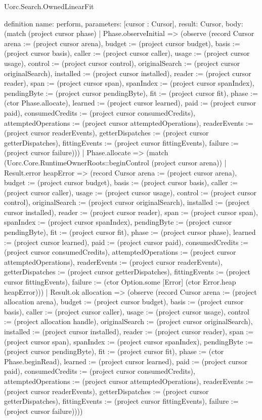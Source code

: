 \begin{lexlean}{Uorc.Search.OwnedLinearFit}
\begin{semanticmodule}
definition{
  name: perform,
  parameters: [cursor : Cursor],
  result: Cursor,
  body: (match (project cursor phase)
    | Phase.observeInitial => (observe (record Cursor {arena := (project cursor arena), budget := (project cursor budget), basis := (project cursor basis), caller := (project cursor caller), usage := (project cursor usage), control := (project cursor control), originalSearch := (project cursor originalSearch), installed := (project cursor installed), reader := (project cursor reader), span := (project cursor span), spanIndex := (project cursor spanIndex), pendingByte := (project cursor pendingByte), fit := (project cursor fit), phase := (ctor Phase.allocate), learned := (project cursor learned), paid := (project cursor paid), consumedCredits := (project cursor consumedCredits), attemptedOperations := (project cursor attemptedOperations), readerEvents := (project cursor readerEvents), getterDispatches := (project cursor getterDispatches), fittingEvents := (project cursor fittingEvents), failure := (project cursor failure)}))
    | Phase.allocate => (match (Uorc.Core.RuntimeOwnerRoots::beginControl (project cursor arena))
      | Result.error heapError => (record Cursor {arena := (project cursor arena), budget := (project cursor budget), basis := (project cursor basis), caller := (project cursor caller), usage := (project cursor usage), control := (project cursor control), originalSearch := (project cursor originalSearch), installed := (project cursor installed), reader := (project cursor reader), span := (project cursor span), spanIndex := (project cursor spanIndex), pendingByte := (project cursor pendingByte), fit := (project cursor fit), phase := (project cursor phase), learned := (project cursor learned), paid := (project cursor paid), consumedCredits := (project cursor consumedCredits), attemptedOperations := (project cursor attemptedOperations), readerEvents := (project cursor readerEvents), getterDispatches := (project cursor getterDispatches), fittingEvents := (project cursor fittingEvents), failure := (ctor Option.some [Error] (ctor Error.heap heapError))})
      | Result.ok allocation => (observe (record Cursor {arena := (project allocation arena), budget := (project cursor budget), basis := (project cursor basis), caller := (project cursor caller), usage := (project cursor usage), control := (project allocation handle), originalSearch := (project cursor originalSearch), installed := (project cursor installed), reader := (project cursor reader), span := (project cursor span), spanIndex := (project cursor spanIndex), pendingByte := (project cursor pendingByte), fit := (project cursor fit), phase := (ctor Phase.beginRead), learned := (project cursor learned), paid := (project cursor paid), consumedCredits := (project cursor consumedCredits), attemptedOperations := (project cursor attemptedOperations), readerEvents := (project cursor readerEvents), getterDispatches := (project cursor getterDispatches), fittingEvents := (project cursor fittingEvents), failure := (project cursor failure)})))
}
\end{semanticmodule}
\end{lexlean}
